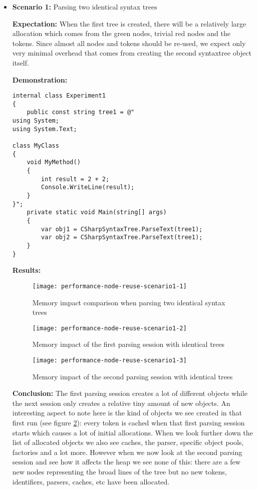 \begin{itemize}
\item \textbf{Scenario 1:} Parsing two identical syntax trees

\textbf{Expectation:} When the first tree is created, there will be a relatively large allocation which comes from the green nodes, trivial red nodes and the tokens. Since almost all nodes and tokens should be re-used, we expect only very minimal overhead that comes from creating the second \gls{syntaxtree} object itself.

\textbf{Demonstration:} 

\begin{lstlisting}
internal class Experiment1
{
	public const string tree1 = @"
using System;
using System.Text;

class MyClass 
{
    void MyMethod()
    {
        int result = 2 + 2;
        Console.WriteLine(result);
    }
}";
	private static void Main(string[] args)
	{
		var obj1 = CSharpSyntaxTree.ParseText(tree1);
		var obj2 = CSharpSyntaxTree.ParseText(tree1);
	}
}
\end{lstlisting}

\textbf{Results:}

\begin{figure}[H]
\centering
\texttt{[image: performance-node-reuse-scenario1-1]}
\caption{Memory impact comparison when parsing two identical syntax trees}
\label{img:performance-node-reuse-scenario1-1}
\end{figure}

\begin{figure}[H]
\centering
\texttt{[image: performance-node-reuse-scenario1-2]}
\caption{Memory impact of the first parsing session with identical trees}
\label{img:performance-node-reuse-scenario1-2}
\end{figure}

\begin{figure}[H]
\centering
\texttt{[image: performance-node-reuse-scenario1-3]}
\caption{Memory impact of the second parsing session with identical trees}
\label{img:performance-node-reuse-scenario1-3}
\end{figure}

\textbf{Conclusion:} The first parsing session creates a lot of different objects while the next session only creates a relative tiny amount of new objects. An interesting aspect to note here is the kind of objects we see created in that first run (see figure \ref{img:performance-node-reuse-scenario1-2}): every token is cached when that first parsing session starts which causes a lot of initial allocations. 
When we look further down the list of allocated objects we also see caches, the parser, specific object pools, factories and a lot more. However when we now look at the second parsing session and see how it affects the heap we see none of this: there are a few new nodes representing the broad lines of the tree but no new tokens, identifiers, parsers, caches, etc have been allocated.



\end{itemize}
